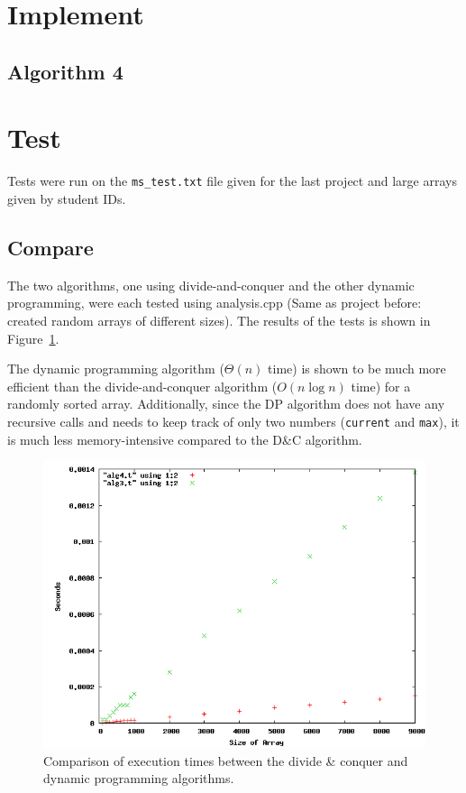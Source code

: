 \documentclass[letterpaper,10pt]{article}
\begin{document}
	\section{Implement}
		\subsection{Algorithm 4}
		


	\section{Test}
		Tests were run on the {\tt ms\_test.txt} file given for the last project and large arrays given by student IDs.


\begin{samepage}
	\section{Compare}
		The two algorithms, one using divide-and-conquer and the other dynamic programming, were each tested using analysis.cpp (Same as project before: created random arrays of different sizes). The results of the tests is shown in Figure~\ref{fig:algcomp}.

		The dynamic programming algorithm ($\Theta(n)$ time) is shown to be much more efficient than the divide-and-conquer algorithm ($O(n \log n)$ time) for a randomly sorted array. Additionally, since the DP algorithm does not have any recursive calls and needs to keep track of only two numbers ({\tt current} and {\tt max}), it is much less memory-intensive compared to the D\&C algorithm.

		\begin{figure}[!htb]
			\centering
			\includegraphics[scale=.5]{timingfiles/algCompareplot.png}
			\caption{Comparison of execution times between the divide \& conquer and dynamic programming algorithms.}
			\label{fig:algcomp}
		\end{figure}
\end{samepage}
\end{document}
